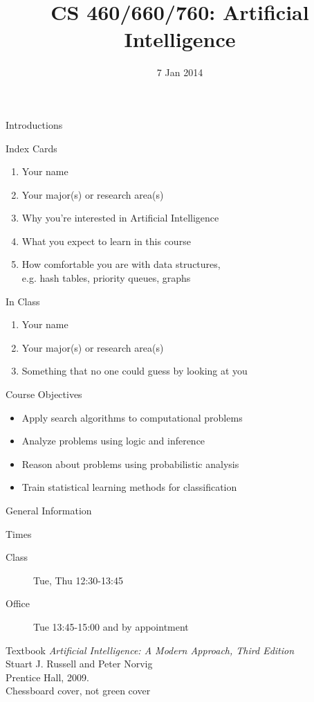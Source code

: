 \documentclass[14pt]{beamer}
\title{CS 460/660/760: Artificial Intelligence}
\date[]{7 Jan 2014}
\begin{document}
\begin{frame}
  \titlepage
\end{frame}

\begin{frame}{Introductions}
	\begin{block}{Index Cards}
		\begin{enumerate}
			\item Your name
			\item Your major(s) or research area(s)
			\item Why you're interested in Artificial Intelligence
			\item What you expect to learn in this course
			\item How comfortable you are with data structures, \\
			      e.g. hash tables, priority queues, graphs
		\end{enumerate}
	\end{block}
	\pause
	\begin{block}{In Class}
		\begin{enumerate}
			\item Your name
			\item Your major(s) or research area(s)
			\item Something that no one could guess by looking at you
		\end{enumerate}
	\end{block}
\end{frame}

\begin{frame}{Course Objectives}
	\begin{itemize}
		\item Apply search algorithms to computational problems
		\item Analyze problems using logic and inference
		\item Reason about problems using probabilistic analysis
		\item Train statistical learning methods for classification
	\end{itemize}
\end{frame}

\begin{frame}{General Information}
	\begin{block}{Times}
		\begin{description}
			\item[Class] Tue, Thu 12:30-13:45
			\item[Office] Tue 13:45-15:00 and by appointment
		\end{description}
	\end{block}
	\begin{block}{Textbook}
		\textit{Artificial Intelligence: A Modern Approach, Third Edition}\\		
		Stuart J. Russell and Peter Norvig\\
		Prentice Hall, 2009.\\
		\hfill \alert{Chessboard cover, not green cover}
	\end{block}
\end{frame}
\end{document}
